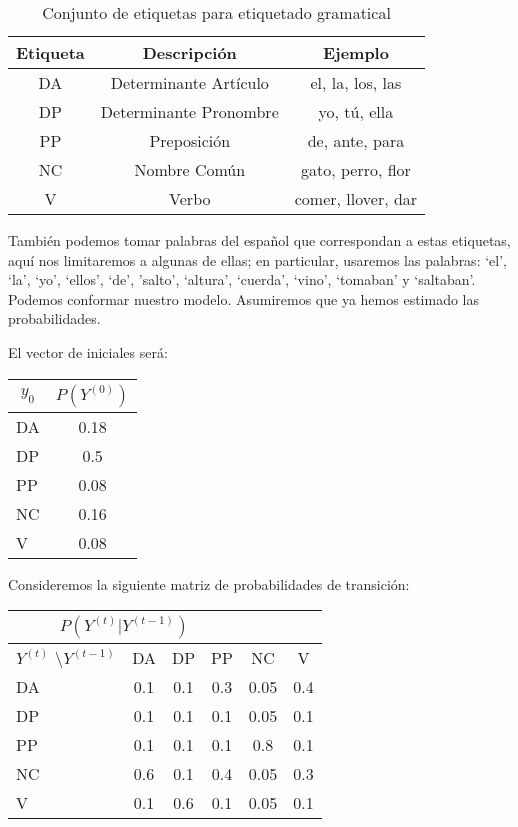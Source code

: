 \begin{table}[]
    \centering
    \begin{tabular}{c c c} \\ \hline
        \textbf{Etiqueta} & \textbf{Descripción} & \textbf{Ejemplo}  \\ \hline
        DA & Determinante Artículo & el, la, los, las \\
        DP & Determinante Pronombre & yo, tú, ella \\
        PP & Preposición & de, ante, para \\
        NC & Nombre Común & gato, perro, flor \\
        V & Verbo & comer, llover, dar \\ \hline
    \end{tabular}
    \caption{Conjunto de etiquetas para etiquetado gramatical}
    \label{tab:Tags}
\end{table}

También podemos tomar palabras del español que correspondan a estas etiquetas, aquí nos limitaremos a algunas de ellas; en particular, usaremos las palabras: `el', `la', `yo', `ellos', `de', 'salto', `altura', `cuerda', `vino', `tomaban' y `saltaban'. Podemos conformar nuestro modelo. Asumiremos que ya hemos estimado las probabilidades.

El vector de iniciales será:

\begin{center}
 \begin{tabular}{l|c}
  \multicolumn{1}{c|}{$y_0$}   &  $P(Y^{(0)})$ \\ \hline
  DA &    0.18 \\
  DP   &    0.5 \\
  PP    &    0.08 \\
  NC & 0.16 \\
  V &  0.08 \\
 \end{tabular}
 \end{center}

 Consideremos la siguiente matriz de probabilidades de transición:

 \begin{center}
 \begin{tabular}{l|ccccc}
  \multicolumn{4}{c}{$P(Y^{(t)}|Y^{(t-1)})$} \\ \hline
  $Y^{(t)}$ \textbackslash $Y^{(t-1)}$          & DA & DP & PP & NC & V \\ \hline
  DA & 0.1  & 0.1  & 0.3 & 0.05 & 0.4 \\
  DP & 0.1  & 0.1  & 0.1 & 0.05 & 0.1 \\
  PP & 0.1  & 0.1  & 0.1 & 0.8  & 0.1 \\
  NC & 0.6  & 0.1  & 0.4 & 0.05 & 0.3 \\
  V  & 0.1  & 0.6  & 0.1 & 0.05 & 0.1 \\
 \end{tabular}
 \end{center}


